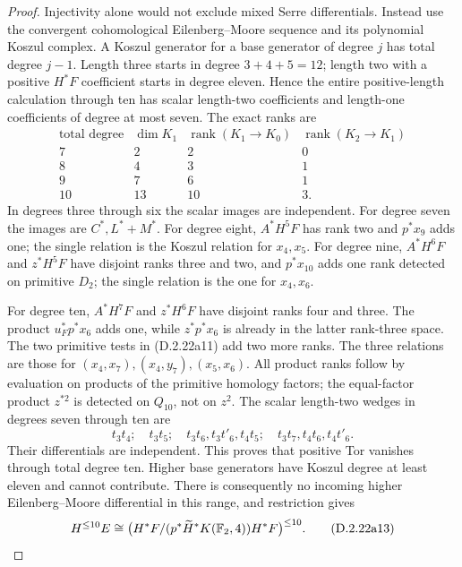 \begin{proof}
Injectivity alone would not exclude mixed Serre differentials.
Instead use the convergent cohomological Eilenberg--Moore sequence
\cite[p.334]{FGHMay1968} and its polynomial Koszul complex.
A Koszul generator for a base generator of degree $j$ has total
degree $j-1$. Length three starts in degree $3+4+5=12$;
length two with a positive $H^*F$ coefficient starts in degree
eleven. Hence the entire positive-length calculation through ten
has scalar length-two coefficients and length-one coefficients
of degree at most seven. The exact ranks are
\[
\begin{array}{c|ccc}
 \text{total degree}&\dim K_1&\operatorname{rank}(K_1\to K_0)
 &\operatorname{rank}(K_2\to K_1)\\\hline
 7&2&2&0\\
 8&4&3&1\\
 9&7&6&1\\
 10&13&10&3.
\end{array}
\tag{D.2.22a12}
\]
In degrees three through six the scalar images are independent.
For degree seven the images are $C^*,L^*+M^*$.
For degree eight, $A^*H^5F$ has rank two and $p^*x_9$
adds one; the single relation is the Koszul relation for
$x_4,x_5$. For degree nine, $A^*H^6F$ and $z^*H^5F$
have disjoint ranks three and two, and $p^*x_{10}$ adds one
rank detected on primitive $D_2$; the single relation is
the one for $x_4,x_6$.

For degree ten, $A^*H^7F$ and $z^*H^6F$ have disjoint ranks
four and three. The product $u_F^*p^*x_6$ adds one, while
$z^*p^*x_6$ is already in the latter rank-three space.
The two primitive tests in \textup{(D.2.22a11)} add two more
ranks. The three relations are those for
$(x_4,x_7),(x_4,y_7),(x_5,x_6)$.
All product ranks follow by evaluation on products of the
primitive homology factors; the equal-factor product $z^{*2}$
is detected on $Q_{10}$, not on $z^2$.
The scalar length-two wedges in degrees seven through ten are
\[
 t_3t_4;\quad t_3t_5;\quad
 t_3t_6,t_3t'_6,t_4t_5;\quad
 t_3t_7,t_4t_6,t_4t'_6.
\]
Their differentials are independent. This proves that positive
Tor vanishes through total degree ten. Higher base generators
have Koszul degree at least eleven and cannot contribute.
There is consequently no incoming higher Eilenberg--Moore
differential in this range, and restriction gives
\[
 H^{\le10}E\cong
 \bigl(H^*F/(p^*\widetilde H^*K(\mathbb F_2,4))H^*F\bigr)^{\le10}.
 \tag{D.2.22a13}
\]


\end{proof}

